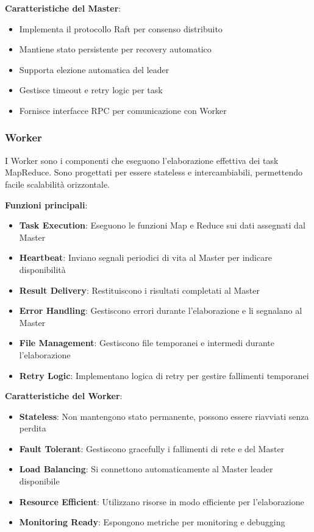 \documentclass[12pt,a4paper]{article}
\begin{document}
\textbf{Caratteristiche del Master}:
\begin{itemize}
\item Implementa il protocollo Raft per consenso distribuito
\item Mantiene stato persistente per recovery automatico
\item Supporta elezione automatica del leader
\item Gestisce timeout e retry logic per task
\item Fornisce interfacce RPC per comunicazione con Worker
\end{itemize}

\subsubsection{Worker}

I Worker sono i componenti che eseguono l'elaborazione effettiva dei task MapReduce. Sono progettati per essere stateless e intercambiabili, permettendo facile scalabilità orizzontale.

\textbf{Funzioni principali}:
\begin{itemize}
\item \textbf{Task Execution}: Eseguono le funzioni Map e Reduce sui dati assegnati dal Master
\item \textbf{Heartbeat}: Inviano segnali periodici di vita al Master per indicare disponibilità
\item \textbf{Result Delivery}: Restituiscono i risultati completati al Master
\item \textbf{Error Handling}: Gestiscono errori durante l'elaborazione e li segnalano al Master
\item \textbf{File Management}: Gestiscono file temporanei e intermedi durante l'elaborazione
\item \textbf{Retry Logic}: Implementano logica di retry per gestire fallimenti temporanei
\end{itemize}

\textbf{Caratteristiche del Worker}:
\begin{itemize}
\item \textbf{Stateless}: Non mantengono stato permanente, possono essere riavviati senza perdita
\item \textbf{Fault Tolerant}: Gestiscono gracefully i fallimenti di rete e del Master
\item \textbf{Load Balancing}: Si connettono automaticamente al Master leader disponibile
\item \textbf{Resource Efficient}: Utilizzano risorse in modo efficiente per l'elaborazione
\item \textbf{Monitoring Ready}: Espongono metriche per monitoring e debugging
\end{itemize}
\end{document}
